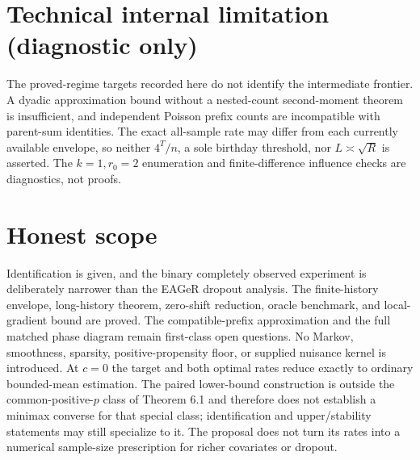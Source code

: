 \documentclass{article}
\begin{document}
\section*{Technical internal limitation (diagnostic only)}

The proved-regime targets recorded here do not identify the intermediate frontier. A dyadic approximation bound without a nested-count second-moment theorem is insufficient, and independent Poisson prefix counts are incompatible with parent-sum identities. The exact all-sample rate may differ from each currently available envelope, so neither \(4^T/n\), a sole birthday threshold, nor \(L\asymp\sqrt R\) is asserted. The \(k=1,r_0=2\) enumeration and finite-difference influence checks are diagnostics, not proofs.

\section{Honest scope}

Identification is given, and the binary completely observed experiment is deliberately narrower than the EAGeR dropout analysis. The finite-history envelope, long-history theorem, zero-shift reduction, oracle benchmark, and local-gradient bound are proved. The compatible-prefix approximation and the full matched phase diagram remain first-class open questions. No Markov, smoothness, sparsity, positive-propensity floor, or supplied nuisance kernel is introduced. At \(c=0\) the target and both optimal rates reduce exactly to ordinary bounded-mean estimation. The paired lower-bound construction is outside the common-positive-\(p\) class of Theorem 6.1 and therefore does not establish a minimax converse for that special class; identification and upper/stability statements may still specialize to it. The proposal does not turn its rates into a numerical sample-size prescription for richer covariates or dropout.
\end{document}
